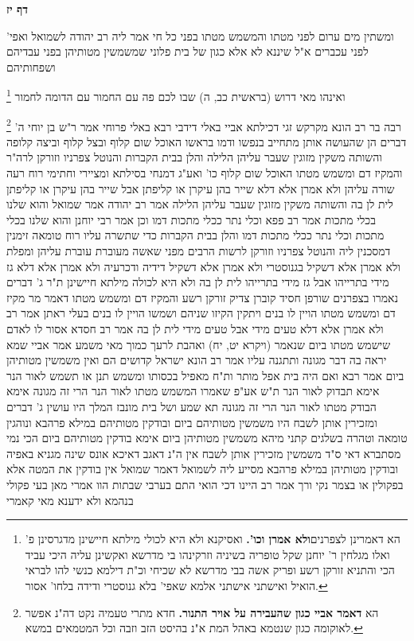 \documentclass[12pt, openany]{book}
\newcommand{\sethebfont}{
\fontsize{10.5pt}{21.0pt} \selectfont
}
\newcommand{\twocol}[1]{
	{\sethebfont \begin{multicols}{2}
			#1
	\end{multicols}}	
}
\newcommand{\sectname}{}
\newcommand{\newsection}[1]{
	\addcontentsline{toc}{section}{#1}
	\renewcommand{\sectname}{#1}	
	\vspace{-\baselineskip}
	\begin{center}
		\textbf{%
\fontsize{16pt}{16pt}\selectfont
			#1}
	\end{center}
	\vspace{-\baselineskip}
	\nopagebreak
}
\newcommand{\footnotecomment}[1]{
	\renewcommand\thefootnote{}
	\footnote{#1}}
\newcommand{\commenta}[1]{\footnotecomment{#1}}
\begin{document}
\newsection{דף יז}
\twocol{ומשתין מים ערום לפני מטתו והמשמש מטתו בפני כל חי אמר ליה רב יהודה לשמואל ואפי' לפני עכברים א"ל שיננא לא אלא כגון של בית פלוני שמשמשין מטותיהן בפני עבדיהם ושפחותיהם 
\commenta{ הא דאמרינן לצפרנים\textbf{ולא אמרן וכו'.} ואסיקנא ולא היא לכולי מילתא חיישינן מדגרסינן פ' ואלו מגלחין ר' יוחנן שקל טופריה בשיניה וזרקינהו בי מדרשא ואקשינן עליה היכי עביד הכי והתניא זורקן רשע ופריק אשה בבי מדרשא לא שכיחי וכ"ת דילמא כנשי להו לבראי הואיל ואישתני אישתני אלמא שאפי' בלא גנוסטרי ודידה בלחו' אסור. }
ואינהו מאי דרוש (בראשית כב, ה) שבו לכם פה עם החמור עם הדומה לחמור 
\commenta{ הא \textbf{דאמר אביי כגון שהעבירה על אויר התנור.} חדא מתרי טעמיה נקט דה"נ אפשר לאוקומה כגון שנטמא באהל המת א"נ בהיסט הזב וזבה וכל המטמאים במשא. }
רבה בר רב הונא מקרקש זגי דכילתא אביי באלי דידבי רבא באלי פרוחי 
אמר ר"ש בן יוחי ה' דברים הן שהעושה אותן מתחייב בנפשו ודמו בראשו האוכל שום קלוף ובצל קלוף וביצה קלופה והשותה משקין מזוגין שעבר עליהן הלילה והלן בבית הקברות והנוטל צפרניו וזורקן לרה"ר והמקיז דם ומשמש מטתו
האוכל שום קלוף כו' ואע"ג דמנחי בסילתא ומציירי וחתימי רוח רעה שורה עליהן ולא אמרן אלא דלא שייר בהן עיקרן או קליפתן אבל שייר בהן עיקרן או קליפתן לית לן בה
והשותה משקין מזוגין שעבר עליהן הלילה אמר רב יהודה אמר שמואל והוא שלנו בכלי מתכות אמר רב פפא וכלי נתר ככלי מתכות דמו וכן אמר רבי יוחנן והוא שלנו בכלי מתכות וכלי נתר ככלי מתכות דמו
והלן בבית הקברות כדי שתשרה עליו רוח טומאה זימנין דמסכנין ליה
והנוטל צפרניו וזורקן לרשות הרבים מפני שאשה מעוברת עוברת עליהן ומפלת ולא אמרן אלא דשקיל בגנוסטרי ולא אמרן אלא דשקיל דידיה ודכרעיה ולא אמרן אלא דלא גז מידי בתרייהו אבל גז מידי בתרייהו לית לן בה ולא היא לכולה מילתא חיישינן 
ת"ר ג' דברים נאמרו בצפרנים שורפן חסיד קוברן צדיק זורקן רשע
והמקיז דם ומשמש מטתו דאמר מר מקיז דם ומשמש מטתו הויין לו בנים ויתקין הקיזו שניהם ושמשו הויין לו בנים בעלי ראתן אמר רב ולא אמרן אלא דלא טעים מידי אבל טעים מידי לית לן בה 
אמר רב חסדא אסור לו לאדם שישמש מטתו ביום שנאמר (ויקרא יט, יח) ואהבת לרעך כמוך מאי משמע אמר אביי שמא יראה בה דבר מגונה ותתגנה עליו אמר רב הונא ישראל קדושים הם ואין משמשין מטותיהן ביום 
אמר רבא ואם היה בית אפל מותר ות"ח מאפיל בכסותו ומשמש 
תנן או תשמש לאור הנר אימא תבדוק לאור הנר 
ת"ש אע"פ שאמרו המשמש מטתו לאור הנר הרי זה מגונה אימא הבודק מטתו לאור הנר הרי זה מגונה 
תא שמע ושל בית מונבז המלך היו עושין ג' דברים ומזכירין אותן לשבח היו משמשין מטותיהם ביום ובודקין מטותיהם במילא פרהבא ונוהגין טומאה וטהרה בשלגים קתני מיהא משמשין מטותיהן ביום 
אימא בודקין מטותיהם ביום הכי נמי מסתברא דאי ס"ד משמשין מזכירין אותן לשבח אין ה"נ דאגב דאיכא אונס שינה מגניא באפיה 
ובודקין מטותיהן במילא פרהבא מסייע ליה לשמואל דאמר שמואל אין בודקין את המטה אלא בפקולין או בצמר נקי ורך אמר רב היינו דכי הואי התם בערבי שבתות הוו אמרי מאן בעי פקולי בנהמא ולא ידענא מאי קאמרי 
}
\end{document}
